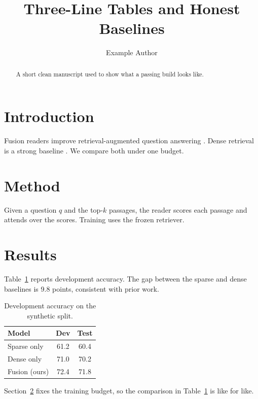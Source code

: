 \documentclass[11pt]{article}
\title{Three-Line Tables and Honest Baselines}
\author{Example Author}
\date{}
\begin{document}
\maketitle

\begin{abstract}
A short clean manuscript used to show what a passing build looks like.
\end{abstract}

\section{Introduction}
\label{sec:intro}
Fusion readers improve retrieval-augmented question answering
\citep{lewis2020rag}. Dense retrieval is a strong baseline
\citep{karpukhin2020dpr}. We compare both under one budget.

\section{Method}
\label{sec:method}
Given a question $q$ and the top-$k$ passages, the reader scores each passage
and attends over the scores. Training uses the frozen retriever.

\section{Results}
\label{sec:results}
Table~\ref{tab:dev} reports development accuracy. The gap between the sparse
and dense baselines is 9.8 points, consistent with prior work.

\begin{table}[t]
\centering
\caption{Development accuracy on the synthetic split.}
\label{tab:dev}
\begin{tabular}{lcc}
\toprule
Model & Dev & Test \\
\midrule
Sparse only & 61.2 & 60.4 \\
Dense only & 71.0 & 70.2 \\
Fusion (ours) & 72.4 & 71.8 \\
\bottomrule
\end{tabular}
\end{table}

Section~\ref{sec:method} fixes the training budget, so the comparison in
Table~\ref{tab:dev} is like for like.



\end{document}
